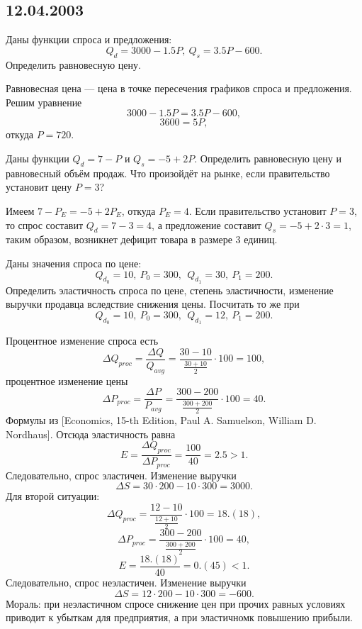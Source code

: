 \documentclass[a4paper]{article}
\begin{document}
\subsection*{12.04.2003}

\begin{problem}
Даны функции спроса и предложения:
$$Q_d=3000-1.5P,~Q_s=3.5P-600.$$ Определить равновесную цену.
\end{problem}
\begin{solution}
Равновесная цена --- цена в точке пересечения графиков спроса и
предложения. Решим уравнение
$$3000-1.5P=3.5P-600,$$ $$3600=5P,$$
откуда $P=720$.
\end{solution}

\begin{problem}
Даны функции $Q_d=7-P$ и $Q_s=-5+2P$. Определить равновесную цену и
равновесный объём продаж. Что произойдёт на рынке, если
правительство установит цену $P=3$?
\end{problem}
\begin{solution}
Имеем $7-P_E=-5+2P_E$, откуда $P_E=4$. Если правительство установит
$P=3$, то спрос составит $Q_d=7-3=4$, а предложение составит $Q_s=-5+2\cdot 3=1$,
таким образом, возникнет дефицит товара в размере 3 единиц.
\end{solution}

\begin{problem}
Даны значения спроса по цене:
$$Q_{d_0}=10,~P_0=300,~~Q_{d_1}=30,~P_1=200.$$ Определить
эластичность спроса по цене, степень эластичности, изменение
выручки продавца вследствие снижения цены. Посчитать то же при
$$Q_{d_0}=10,~P_0=300,~~Q_{d_1}=12,~P_1=200.$$
\end{problem}
\begin{solution}
Процентное изменение спроса есть
$$\Delta Q_{proc}=\frac{\Delta Q}{Q_{avg}}=\frac{30-10}{\frac{30+10}{2}}\cdot 100=100,$$
процентное изменение цены
$$\Delta P_{proc}=\frac{\Delta P}{P_{avg}}=\frac{300-200}{\frac{300+200}{2}}\cdot 100=40.$$
Формулы из [Economics, 15-th Edition, Paul A. Samuelson, William D. Nordhaus].
Отсюда эластичность равна $$E=\frac{\Delta Q_{proc}}{\Delta P_{proc}}=\frac{100}{40}=2.5>1.$$
Следовательно, спрос эластичен. Изменение выручки $$\Delta S = 30 \cdot 200 - 10 \cdot 300 = 3000.$$
Для второй ситуации:
$$\Delta Q_{proc}=\frac{12-10}{\frac{12+10}{2}}\cdot 100= 18.(18),$$
$$\Delta P_{proc}=\frac{300-200}{\frac{300+200}{2}}\cdot 100=40,$$
$$E=\frac{18.(18)}{40}=0.(45)<1.$$
Следовательно, спрос неэластичен. Изменение выручки $$\Delta S = 12 \cdot 200 - 10 \cdot 300 = -600.$$
Мораль: при неэластичном спросе снижение цен при прочих равных условиях приводит к убыткам
для предприятия, а при эластичном\т к повышению прибыли.
\end{solution}
\end{document}
